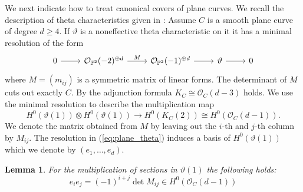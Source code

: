 \documentclass[12pt]{extarticle}
\newtheorem{lemma}[theorem]{Lemma}
\theoremstyle{definition}
\numberwithin{theorem}{section}
\newcommand{\OO}{\mathcal{O}}
\newcommand{\op}{\operatorname}
\begin{document}
We next indicate how to treat canonical covers of plane curves. We recall the description of theta characteristics given in \cite[Proposition 3.1 a)]{Beauville}: Assume $C$ is a smooth plane curve of degree $d \geq 4$. If $\vartheta$ is a noneffective theta characteristic on it it has a minimal resolution of the form 
\begin{equation}\label{eq:plane_theta}
\begin{tikzcd}[ampersand replacement=\&]
	0 \& {\mathcal{O}_{\mathbb{P}^2}(-2)^{\oplus d }} \& {\mathcal{O}_{\mathbb{P}^2}(-1)^{\oplus d }} \& \vartheta \& 0
	\arrow[from=1-1, to=1-2]
	\arrow[from=1-3, to=1-4]
	\arrow[from=1-4, to=1-5]
	\arrow["M", from=1-2, to=1-3]
\end{tikzcd}
\end{equation}
where $M = (m_{ij})$ is a symmetric matrix of linear forms. The determinant of $M$ cuts out exactly $C$. By the adjunction formula $K_C \cong \OO_C(d-3)$ holds. We use the minimal resolution to describe the multiplication map 
\begin{equation*}
H^0(\vartheta(1)) \otimes H^0(\vartheta(1)) \rightarrow H^0(K_C(2)) \cong H^0(\OO_C(d-1)).
\end{equation*}
We denote the matrix obtained from $M$ by leaving out the $i$-th and $j$-th column by $M_{ij}$. The resolution in (\ref{eq:plane_theta}) induces a basis of $H^0(\vartheta(1))$ which we denote by $(e_1,\ldots,e_d)$.
\begin{lemma}
For the multiplication of sections in $\vartheta(1)$ the following holds:
\begin{equation*}
e_ie_j = (-1)^{i+j}\op{det}M_{ij}\in H^0(\OO_C(d-1))
\end{equation*}
\end{lemma}
\end{document}

